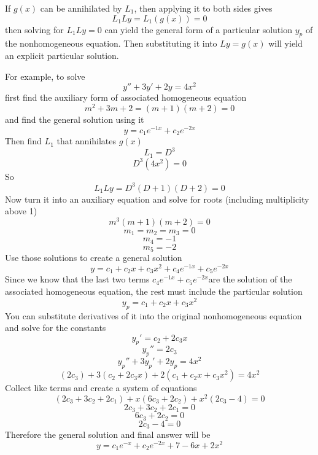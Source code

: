 If $g(x)$ can be annihilated by $L_1$, then applying it to both sides gives
\[
    L_1 Ly = L_1(g(x)) = 0
\]
then solving for $L_1 Ly = 0$ can yield the general form of a particular solution $y_p$ of the nonhomogeneous equation. Then substituting it into $Ly = g(x)$ will yield an explicit particular solution.

For example, to solve
\[
    y'' + 3y' + 2y = 4x^2
\]
first find the auxiliary form of associated homogeneous equation
\[
    m^2 + 3m + 2 = (m + 1)(m + 2) = 0
\]
and find the general solution using it
\[
    y = c_1 e^{-1x} + c_2 e^{-2x}
\]
Then find $L_1$ that annihilates $g(x)$
\[
    L_1 = D^3
\]
\[
    D^3 (4x^2) = 0
\]
So
\[
    L_1 Ly = D^3 (D + 1)(D + 2) = 0
\]
Now turn it into an auxiliary equation and solve for roots (including multiplicity above 1)
\[
    m^3 (m + 1)(m + 2) = 0
\]
\[
    m_1 = m_2 = m_3 = 0
\]
\[
    m_4 = -1
\]
\[
    m_5 = -2
\]
Use those solutions to create a general solution
\[
    y = c_1 + c_2 x + c_3 x^2 + c_4 e^{-1x} + c_5 e^{-2 x}
\]
Since we know that the last two terms $c_4 e^{-1x} + c_5 e^{-2 x}$are the solution of the associated homogeneous equation, the rest must include the particular solution
\[
    y_p = c_1 + c_2 x + c_3 x^2
\]
You can substitute derivatives of it into the original nonhomogeneous equation and solve for the constants
\[
    y_p' = c_2 + 2c_3 x
\]
\[
    y_p'' = 2c_3
\]
\[
    y_p'' + 3y_p' + 2y_p = 4x^2
\]
\[
    (2c_3) + 3(c_2 + 2c_3 x) + 2(c_1 + c_2 x + c_3 x^2) = 4x^2
\]
Collect like terms and create a system of equations
\[
    (2c_3 + 3c_2 + 2c_1) + x(6c_3 + 2c_2) + x^2 (2c_3 - 4) = 0
\]
\[
    2c_3 + 3c_2 + 2c_1 = 0
\]
\[
    6c_3 + 2c_2 = 0
\]
\[
    2c_3 - 4 = 0
\]
Therefore the general solution and final answer will be
\[
    y = c_1 e^{-x} + c_2 e^{-2x} + 7 - 6x + 2x^2
\]